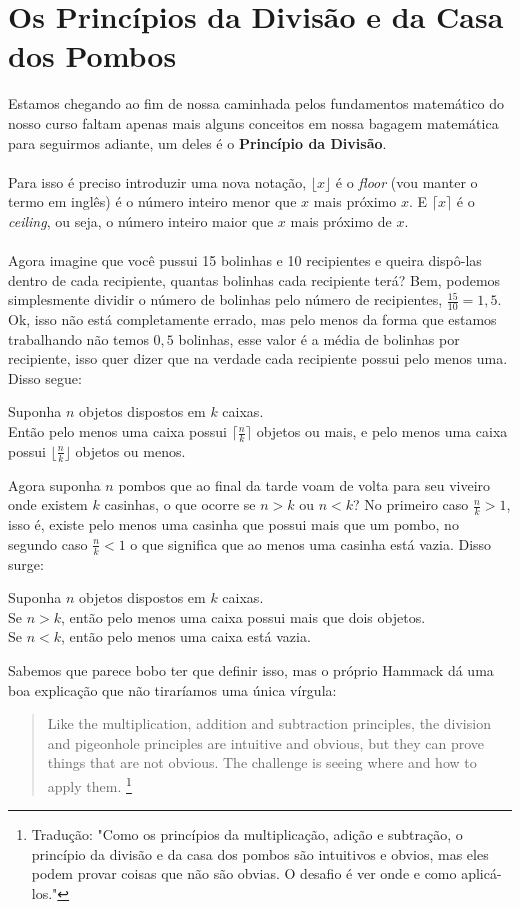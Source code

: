 \documentclass[main.tex]{subfiles}
\begin{document}
\section{Os Princípios da Divisão e da Casa dos Pombos}

Estamos chegando ao fim de nossa caminhada pelos fundamentos matemático do nosso curso faltam apenas mais alguns conceitos em nossa bagagem matemática para seguirmos adiante, um deles é o \textbf{Princípio da Divisão}.
\\~\\
Para isso é preciso introduzir uma nova notação, $\lfloor x \rfloor$ é o \textit{floor} (vou manter o termo em inglês) é o número inteiro menor que $x$ mais próximo $x$. E $\lceil x \rceil$ é o \textit{ceiling}, ou seja, o número inteiro maior que $x$ mais próximo de $x$.
\\~\\
Agora imagine que você pussui 15 bolinhas e 10 recipientes e queira dispô-las dentro de cada recipiente, quantas bolinhas cada recipiente terá? Bem, podemos simplesmente dividir o número de bolinhas pelo número de recipientes, $\frac{15}{10} = 1,5$. Ok, isso não está completamente errado, mas pelo menos da forma que estamos trabalhando não temos $0,5$ bolinhas, esse valor é a média de bolinhas por recipiente, isso quer dizer que na verdade cada recipiente possui pelo menos uma. Disso segue: 
\begin{fact}
Suponha $n$ objetos dispostos em $k$ caixas. \\
Então pelo menos uma caixa possui $\lceil \frac{n}{k} \rceil$ objetos ou mais, e
pelo menos uma caixa possui $\lfloor \frac{n}{k} \rfloor$ objetos ou menos.
\end{fact}
Agora suponha $n$ pombos que ao final da tarde voam de volta para seu viveiro onde existem $k$ casinhas, o que ocorre se $n > k$ ou $n < k$?
No primeiro caso $\frac{n}{k} > 1$, isso é, existe pelo menos uma casinha que possui mais que um pombo, no segundo caso $\frac{n}{k} < 1$ o que significa que ao menos uma casinha está vazia. Disso surge:
\begin{fact}
Suponha $n$ objetos dispostos em $k$ caixas.\\
Se $n > k$, então pelo menos uma caixa possui mais que dois objetos.\\
Se $n < k$, então pelo menos uma caixa está vazia.
\end{fact}
Sabemos que parece bobo ter que definir isso, mas o próprio Hammack dá uma boa explicação que não tiraríamos uma única vírgula:
\begin{quote}
Like the multiplication, addition and subtraction principles, the division
and pigeonhole principles are intuitive and obvious, but they can prove
things that are not obvious. The challenge is seeing where and how to apply
them. \footnote{Tradução: "Como os princípios da multiplicação, adição e subtração, o princípio da divisão e da casa dos pombos são intuitivos e obvios, mas eles podem provar coisas que não são obvias. O desafio é ver onde e como aplicá-los."}
\end{quote}
\end{document}
